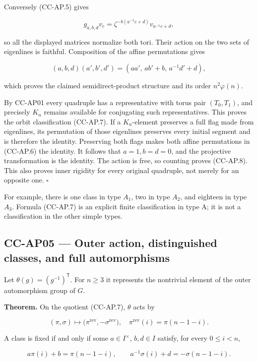 \documentclass[11pt,a4paper]{article}
\theoremstyle{definition}\newtheorem{definition}[theorem]{Definition}
\theoremstyle{remark}\newtheorem{remark}[theorem]{Remark}
\begin{document}
Conversely (CC-AP.5) gives

\[
 g_{a,b,d}v_c
 =\zeta^{-b(a^{-1}c+d)}v_{a^{-1}c+d},
\]

so all the displayed matrices normalize both tori. Their action on the
two sets of eigenlines is faithful. Composition of the affine
permutations gives

\[
 (a,b,d)(a',b',d')
 =(aa',\,ab'+b,\,a^{-1}d'+d),
\]

which proves the claimed semidirect-product structure and its order
\(n^2\varphi(n)\).

By CC-AP01 every quadruple has a representative with torus pair
\((T_0,T_1)\), and precisely \(K_n\) remains available for conjugating
such representatives. This proves the orbit classification (CC-AP.7). If
a \(K_n\)-element preserves a full flag made from eigenlines, its
permutation of those eigenlines preserves every initial segment and is
therefore the identity. Preserving both flags makes both affine
permutations in (CC-AP.6) the identity. It follows that \(a=1,b=d=0\),
and the projective transformation is the identity. The action is free,
so counting proves (CC-AP.8). This also proves inner rigidity for every
original quadruple, not merely for an opposite one. \(\square\)

For example, there is one class in type \(A_1\), two in type \(A_2\),
and eighteen in type \(A_3\). Formula (CC-AP.7) is an explicit finite
classification in type A; it is not a classification in the other simple
types.

\subsection{CC-AP05 --- Outer action, distinguished classes, and full
automorphisms}\label{cc-ap05-outer-action-distinguished-classes-and-full-automorphisms}

Let \(\theta(g)=(g^{-1})^{\mathsf T}\). For \(n\geq3\) it represents the
nontrivial element of the outer automorphism group of \(G\).

\textbf{Theorem.} On the quotient (CC-AP.7), \(\theta\) acts by

\[
 (\pi,\sigma)\longmapsto
 \bigl(\pi^{\mathrm{rev}},-\sigma^{\mathrm{rev}}\bigr),
 \quad
 \pi^{\mathrm{rev}}(i)=\pi(n-1-i).
 \tag{CC-AP.10}
\]

A class is fixed if and only if some \(a\in I^\times\), \(b,d\in I\)
satisfy, for every \(0\leq i<n\),

\[
 a\pi(i)+b=\pi(n-1-i),\qquad
 a^{-1}\sigma(i)+d=-\sigma(n-1-i).
 \tag{CC-AP.11}
\]
\end{document}
